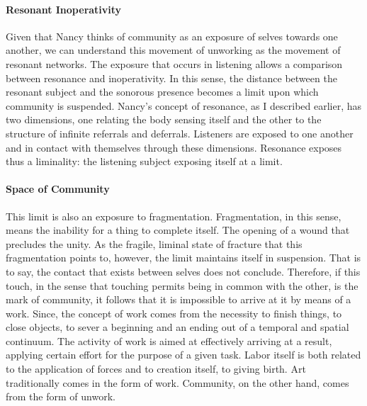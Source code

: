 \paragraph{Resonant Inoperativity}
Given that Nancy thinks of community as an exposure of selves towards one another, we can understand this movement of unworking as the movement of resonant networks. The exposure that occurs in listening allows a comparison between resonance and inoperativity. In this sense, the distance between the resonant subject and the sonorous presence becomes a limit upon which community is suspended. Nancy's concept of resonance, as I described earlier, has two dimensions, one relating the body sensing itself and the other to the structure of infinite referrals and deferrals. Listeners are exposed to one another and in contact with themselves through these dimensions. Resonance exposes thus a liminality: the listening subject exposing itself at a limit.

\paragraph{Space of Community}
This limit is also an exposure to fragmentation. Fragmentation, in this sense, means the inability for a thing to complete itself. The opening of a wound that precludes the unity. As the fragile, liminal state of fracture that this fragmentation points to, however, the limit maintains itself in suspension. That is to say, the contact that exists between selves does not conclude. Therefore, if this touch, in the sense that touching permits being in common with the other, is the mark of community, it follows that it is impossible to arrive at it by means of a work. Since, the concept of work comes from the necessity to finish things, to close objects, to sever a beginning and an ending out of a temporal and spatial continuum. The activity of work is aimed at effectively arriving at a result, applying certain effort for the purpose of a given task. Labor itself is both related to the application of forces and to creation itself, to giving birth. Art traditionally comes in the form of work. Community, on the other hand, comes from the form of unwork.

